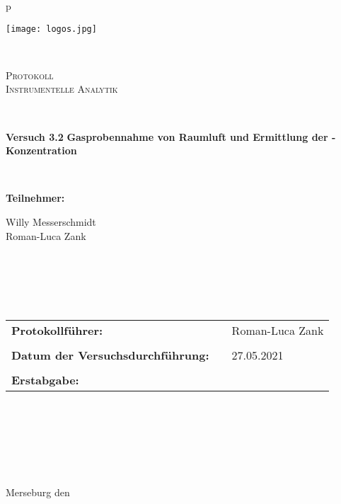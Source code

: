 \begin{center}
\begin{tabular}{p{\textwidth}}


\begin{center}
\texttt{[image: logos.jpg]}\\
\end{center}


\\

\begin{center}
\LARGE{\textsc{
Protokoll \\
Instrumentelle Analytik\\
}}
\end{center}

\\

%

\begin{center}
\textbf{\Large{Versuch 3.2}}
\textbf{\Large{Gasprobennahme von Raumluft und Ermittlung der -Konzentration}}
\end{center}


\\

\begin{center}
\Large{\textbf{Teilnehmer:}} \\ 
\end{center}
\begin{center}
\large{Willy Messerschmidt} \\
\large{Roman-Luca Zank} \\
\end{center}


\\ \\ \\ \\

\begin{center}
\begin{tabular}{lll}
\large{\textbf{Protokollführer:}} & & \large{Roman-Luca Zank}\\
&&\\
\large{\textbf{Datum der Versuchsdurchführung:}}&& \large{27.05.2021}\\
&&\\
\large{\textbf{Erstabgabe:}}&& \large{\todayDE}\\
\end{tabular}
\end{center}

\\ \\ \\ \\ \\ \\ 

\large{Merseburg den \todayDE}

\end{tabular}
\end{center}
